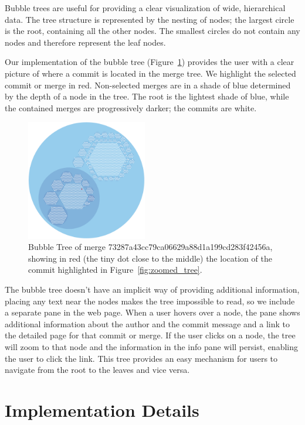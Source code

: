 \documentclass[conference, draftclsnofoot, draft]{IEEEtran}
\begin{document}
Bubble trees are useful for providing a clear visualization of wide, hierarchical
data\cite{Boardman2000}. The tree structure is represented by the nesting of nodes;
the largest circle is the root, containing all the other nodes. The smallest circles
do not contain any nodes and therefore represent the leaf nodes.

Our implementation of the bubble tree (Figure~\ref{fig:bubble_tree}) provides the
user with a clear picture of where a commit is located in the merge tree. We
highlight the selected commit or merge in red. Non-selected merges are in a shade of
blue determined by the depth of a node in the tree. The root is the lightest shade
of blue, while the contained merges are progressively darker; the commits are white.

\begin{figure}
        \centering
        \includegraphics[width=0.47\textwidth]{figures/bubble_tree.pdf}
        \caption{Bubble Tree of merge 73287a43cc79ca06629a88d1a199cd283f42456a,
                showing in red (the tiny dot close to the middle) the location of
                the commit highlighted in Figure~\ref{fig:zoomed_tree}.}
        \label{fig:bubble_tree}
\end{figure}

The bubble tree doesn't have an implicit way of providing additional information,
placing any text near the nodes makes the tree impossible to read, so we include a
separate pane in the web page. When a user hovers over a node, the pane shows
additional information about the author and the commit message and a link to the
detailed page for that commit or merge. If the user clicks on a node, the tree will
zoom to that node and the information in the info pane will persist, enabling the
user to click the link. This tree provides an easy mechanism for users to navigate
from the root to the leaves and vice versa.

\section{Implementation Details}
\end{document}
